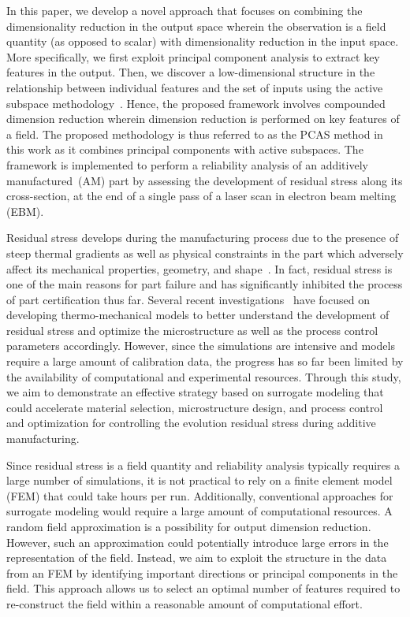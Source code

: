 In this paper, we develop a novel approach that focuses on combining the dimensionality reduction in the output space 
wherein the observation is a field quantity (as opposed to scalar) with dimensionality reduction in the input space. 
More specifically, we first exploit principal component analysis to extract key features in the output. Then, we discover a 
low-dimensional structure in the relationship between individual features and the set of inputs using the active
subspace methodology~\cite{Constantine:2015}. Hence, the proposed framework involves compounded dimension
reduction wherein dimension reduction is performed on key features of a field. The proposed methodology is
thus referred to as the PCAS method in this work as it combines principal components with active subspaces.
The framework is implemented to
perform a reliability analysis of an additively manufactured~(AM) part by assessing the development of residual stress
along its cross-section, at the end of a single pass of a laser scan in electron beam melting (EBM). 

Residual stress develops during the manufacturing process due to the presence of steep thermal gradients as
well as physical constraints in the part which adversely affect its mechanical properties, geometry, and 
shape~\cite{Withers:2001,Mercelis:2006,Hofmann:2014}. 
In fact, residual stress is one of the main reasons for part failure and has significantly inhibited the process
of part certification thus far. Several recent investigations~\cite{Vastola:2016,Hodge:2016,Williams:2018}
have focused on developing thermo-mechanical
models to better understand the development of residual stress and optimize the microstructure as well as
the process control parameters accordingly. However, since the simulations are intensive and models require a 
large amount of calibration data, the progress has so far been limited by the availability
of computational and experimental resources. Through this study, we aim to demonstrate an effective strategy
based on surrogate modeling that could accelerate material selection, microstructure design, and
process control and optimization for controlling the evolution residual stress during additive manufacturing. 

Since residual
stress is a field quantity and reliability analysis typically requires a large number of simulations, it is not practical
to rely on a finite element model (FEM) that could take hours per run. Additionally, conventional approaches for surrogate
modeling would require a large amount of computational resources. A random field approximation is a possibility for
output dimension reduction. However, such an approximation could potentially introduce large errors in the  
representation of the field. Instead, we aim to exploit the structure in the data from an FEM by identifying important 
directions or principal components in the field. This approach allows us to select an optimal number of 
features required to re-construct the field within a reasonable amount of computational effort. 

